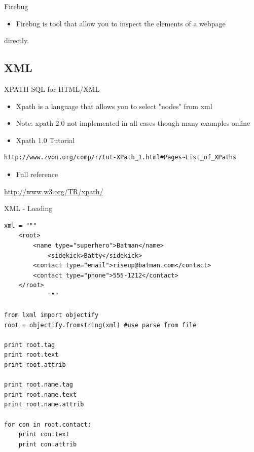 \documentclass[presentation]{beamer}
\begin{document}
\begin{frame}[label=sec-5-1-2]{Firebug}
\begin{itemize}
\item Firebug is tool that allow you to inspect the elements of a webpage
\end{itemize}
directly. 
\end{frame}


\subsection{XML}
\label{sec-5-2}

\begin{frame}[fragile,label=sec-5-2-1]{XPATH SQL for HTML/XML}
 \begin{itemize}
\item Xpath is a language that allows you to select "nodes" from xml
\item Note: xpath 2.0 not implemented in all cases though many examples online
\item Xpath 1.0 Tutorial
\end{itemize}
\begin{verbatim}
http://www.zvon.org/comp/r/tut-XPath_1.html#Pages~List_of_XPaths
\end{verbatim}
\begin{itemize}
\item Full reference
\end{itemize}
\url{http://www.w3.org/TR/xpath/} 
\end{frame}




\begin{frame}[fragile,shrink=1,label=sec-5-2-2]{XML - Loading}

 \lstset{numbers=left,language=Python,label= ,caption= }
\begin{lstlisting}
xml = """
    <root>
        <name type="superhero">Batman</name>
            <sidekick>Batty</sidekick>
        <contact type="email">riseup@batman.com</contact>
        <contact type="phone">555-1212</contact>
    </root>
            """

from lxml import objectify
root = objectify.fromstring(xml) #use parse from file

print root.tag
print root.text
print root.attrib

print root.name.tag
print root.name.text
print root.name.attrib

for con in root.contact:
    print con.text
    print con.attrib
\end{lstlisting}
\end{frame}
\end{document}

